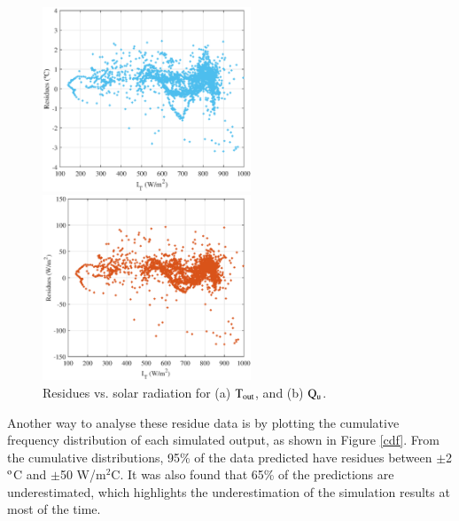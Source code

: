 \begin{figure}[ht!]
	\begin{minipage}{0.49\columnwidth}
		\includegraphics[width=0.95\columnwidth,height=5.5cm]{figs/residueT_it.eps}
	\end{minipage}
	\begin{minipage}{0.49\columnwidth}
		\includegraphics[width=1.0\columnwidth,height=5.5cm]{figs/residueQ_it.eps}
	\end{minipage}
	\caption{Residues vs. solar radiation for (a) $\rm{T_{out}}$, and (b) $\rm{Q_u}$.}
	\label{res_it}
\end{figure}

Another way to analyse these residue data is by plotting the cumulative frequency distribution of each simulated output, as shown in Figure \ref{cdf}. From the cumulative distributions, 95\% of the data predicted have residues between $\pm$2 $^{\rm{o}}$C and $\pm$50 W/m$^{2}$C. It was also found that 65\% of the predictions are underestimated, which highlights the underestimation of the simulation results at most of the time.

